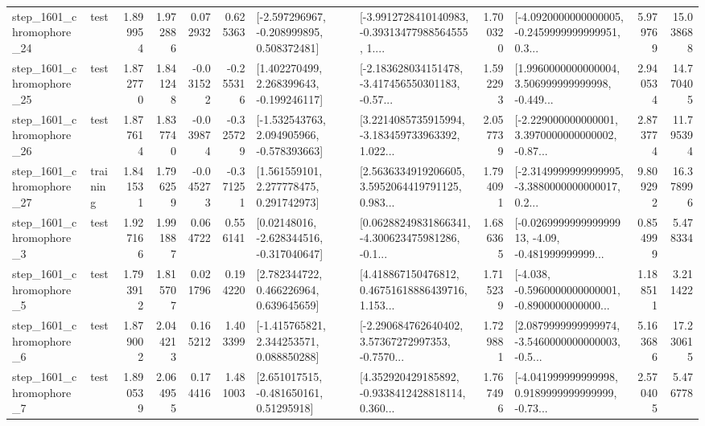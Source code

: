 \begin{tabular}{llrrrrllrlrr}
 step\_1601\_chromophore\_24 &      test &      1.899954 &    1.972886 &      0.072932 &  0.625363 &   [-2.597296967, -0.208999895, 0.508372481] &  [-3.9912728410140983, -0.39313477988564555, 1.... &       1.700320 &  [-4.0920000000000005, -0.2459999999999951, 0.3... &            5.979769 &         15.038688 \\
 step\_1601\_chromophore\_25 &      test &      1.872770 &    1.841248 &     -0.031522 & -0.255316 &    [1.402270499, 2.268399643, -0.199246117] &  [-2.183628034151478, -3.417456550301183, -0.57... &       1.592293 &  [1.9960000000000004, 3.506999999999998, -0.449... &            2.940534 &         14.770405 \\
 step\_1601\_chromophore\_26 &      test &      1.877614 &    1.837740 &     -0.039874 & -0.325729 &   [-1.532543763, 2.094905966, -0.578393663] &  [3.2214085735915994, -3.183459733963392, 1.022... &       2.057739 &  [-2.229000000000001, 3.3970000000000002, -0.87... &            2.873774 &         11.795394 \\
 step\_1601\_chromophore\_27 &  training &      1.841531 &    1.796259 &     -0.045273 & -0.371251 &     [1.561559101, 2.277778475, 0.291742973] &  [2.5636334919206605, 3.5952064419791125, 0.983... &       1.794091 &  [-2.3149999999999995, -3.3880000000000017, 0.2... &            9.809292 &         16.378996 \\
  step\_1601\_chromophore\_3 &      test &      1.927166 &    1.991887 &      0.064722 &  0.556141 &    [0.02148016, -2.628344516, -0.317040647] &  [0.06288249831866341, -4.300623475981286, -0.1... &       1.686365 &  [-0.026999999999999913, -4.09, -0.481999999999... &            0.854999 &          5.478334 \\
  step\_1601\_chromophore\_5 &      test &      1.793912 &    1.815707 &      0.021796 &  0.194220 &     [2.782344722, 0.466226964, 0.639645659] &  [4.418867150476812, 0.46751618886439716, 1.153... &       1.715239 &  [-4.038, -0.5960000000000001, -0.8900000000000... &            1.188511 &          3.211422 \\
  step\_1601\_chromophore\_6 &      test &      1.879002 &    2.044213 &      0.165212 &  1.403399 &    [-1.415765821, 2.344253571, 0.088850288] &  [-2.290684762640402, 3.57367272997353, -0.7570... &       1.729881 &  [2.0879999999999974, -3.5460000000000003, -0.5... &            5.163686 &         17.230615 \\
  step\_1601\_chromophore\_7 &      test &      1.890539 &    2.064955 &      0.174416 &  1.481003 &     [2.651017515, -0.481650161, 0.51295918] &  [4.352920429185892, -0.9338412428818114, 0.360... &       1.767496 &  [-4.041999999999998, 0.9189999999999999, -0.73... &            2.570405 &          5.476778 \\

\end{tabular}
